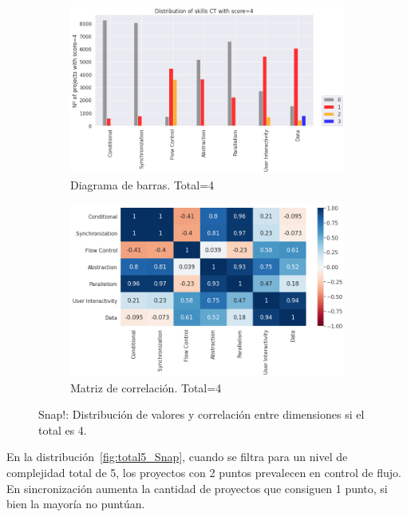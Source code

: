 \documentclass[a4paper, 12pt]{book}
\begin{document}
\begin{figure}[H]
    \centering
    \begin{subfigure}[h]{.49\textwidth} 
        \includegraphics[width=\textwidth]{img/distribucion_4_Snap}
        \caption{Diagrama de barras. Total=4}
        \label{fig:total4_Snap}
    \end{subfigure}       
    \begin{subfigure}[h]{.49\textwidth} 
        \includegraphics[width=\textwidth]{img/corr_4_Snap}
        \caption{Matriz de correlación. Total=4}
        \label{fig:corr4_Snap}
    \end{subfigure}
     \caption{Snap!: Distribución de valores y correlación entre dimensiones si el total es 4.}
\end{figure}

En la distribución~\ref{fig:total5_Snap}, cuando se filtra para un nivel de complejidad total de 5, los proyectos con 2 puntos prevalecen en control de flujo. En sincronización aumenta la cantidad de proyectos que consiguen 1 punto, si bien la mayoría no puntúan.
\end{document}
